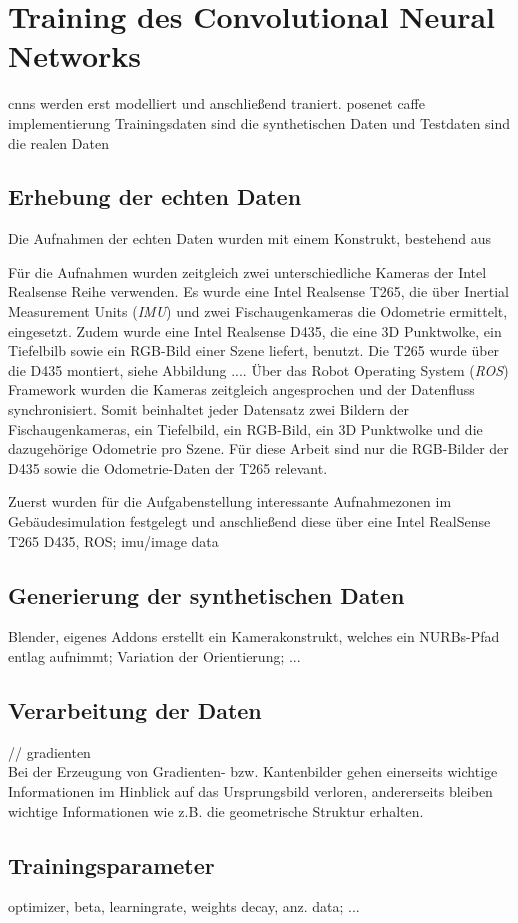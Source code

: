 
\section{Training des Convolutional Neural Networks}
cnns werden erst modelliert und anschließend traniert.
posenet caffe implementierung
Trainingsdaten sind die synthetischen Daten und Testdaten sind die realen Daten

\subsection{Erhebung der echten Daten}

Die Aufnahmen der echten Daten wurden mit einem Konstrukt, bestehend aus 

Für die Aufnahmen wurden zeitgleich zwei unterschiedliche Kameras der Intel Realsense Reihe verwenden. Es wurde eine Intel Realsense T265, die über Inertial Measurement Units (\textit{IMU}) und zwei Fischaugenkameras die Odometrie ermittelt, eingesetzt. Zudem wurde eine Intel Realsense D435, die eine 3D Punktwolke, ein Tiefelbilb sowie ein RGB-Bild einer Szene liefert, benutzt. Die T265 wurde über die D435 montiert, siehe Abbildung .... Über das Robot Operating System (\textit{ROS}) Framework wurden die Kameras zeitgleich angesprochen und der Datenfluss synchronisiert. Somit beinhaltet jeder Datensatz zwei Bildern der Fischaugenkameras, ein Tiefelbild, ein RGB-Bild, ein 3D Punktwolke und die dazugehörige Odometrie pro Szene. Für diese Arbeit sind nur die RGB-Bilder der D435 sowie die Odometrie-Daten der T265 relevant.

Zuerst wurden für die Aufgabenstellung interessante Aufnahmezonen im Gebäudesimulation festgelegt und anschließend diese über eine
Intel RealSense T265 D435, ROS; imu/image data


\subsection{Generierung der synthetischen Daten}
Blender,
eigenes Addons erstellt ein Kamerakonstrukt, welches ein NURBs-Pfad entlag aufnimmt; Variation der Orientierung; ...

\subsection{Verarbeitung der Daten}
// gradienten\\
Bei der Erzeugung von Gradienten- bzw. Kantenbilder gehen einerseits wichtige Informationen im Hinblick auf das Ursprungsbild verloren, andererseits bleiben wichtige Informationen wie z.B. die geometrische Struktur erhalten.

\subsection{Trainingsparameter}
optimizer, beta,
learningrate,
weights decay, anz. data; ...